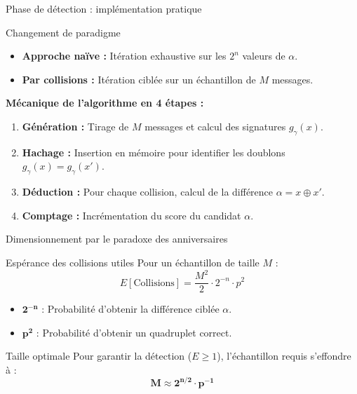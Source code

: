 \begin{frame}{Phase de détection : implémentation pratique}
    
    \begin{block}{Changement de paradigme}
        \begin{itemize}
            \item \textbf{Approche naïve :} Itération exhaustive sur les $2^n$ valeurs de $\alpha$.
            \item \textbf{Par collisions :} Itération ciblée sur un échantillon de $M$ messages.
        \end{itemize}
    \end{block}

    \vspace{0.4cm}
    \textbf{Mécanique de l'algorithme en 4 étapes :}
    \vspace{0.2cm}

    \begin{enumerate}
        \item \textbf{Génération :} Tirage de $M$ messages et calcul des signatures $g_\gamma(x)$.
        \item \textbf{Hachage :} Insertion en mémoire pour identifier les doublons $g_\gamma(x) = g_\gamma(x')$.
        \item \textbf{Déduction :} Pour chaque collision, calcul de la différence $\alpha = x \oplus x'$.
        \item \textbf{Comptage :} Incrémentation du score du candidat $\alpha$.
    \end{enumerate}

\end{frame}

\begin{frame}{Dimensionnement par le paradoxe des anniversaires}

    \begin{block}{Espérance des collisions utiles}
        Pour un échantillon de taille $M$ :
        \[ E[\text{Collisions}] = \frac{M^2}{2} \cdot 2^{-n} \cdot p^2 \]
    \end{block}

    \begin{itemize}
        \item $\mathbf{2^{-n}}$ : Probabilité d'obtenir la différence ciblée $\alpha$.
        \item $\mathbf{p^2}$ : Probabilité d'obtenir un quadruplet correct.
    \end{itemize}

    \vspace{0.2cm}

    \begin{block}{Taille optimale}
        Pour garantir la détection ($E \ge 1$), l'échantillon requis s'effondre à :
        \[ \mathbf{M \approx 2^{n/2} \cdot p^{-1}} \]
    \end{block}

\end{frame}

